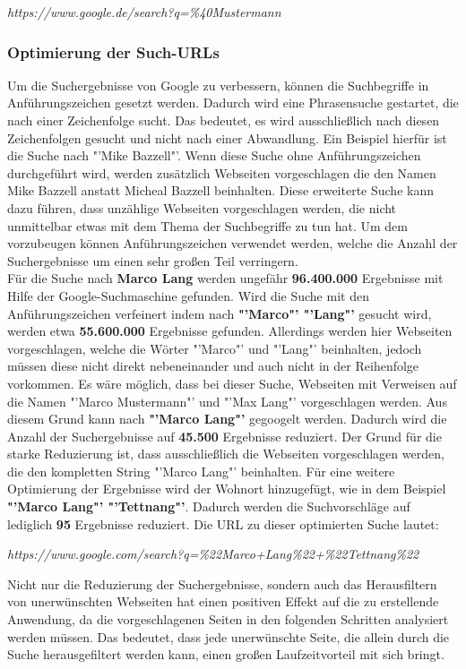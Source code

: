 			\textit{https://www.google.de/search?q=\%40Mustermann}
			
			\subsubsection{Optimierung der Such-URLs}
			\label{subsubsec:URLOptimieren}
			Um die Suchergebnisse von Google zu verbessern, können die Suchbegriffe in Anführungszeichen gesetzt werden. Dadurch wird eine Phrasensuche gestartet, die nach einer Zeichenfolge sucht. Das bedeutet, es wird ausschließlich nach diesen Zeichenfolgen gesucht und nicht nach einer Abwandlung. Ein Beispiel hierfür ist die Suche nach "'Mike Bazzell"'. Wenn diese Suche ohne Anführungszeichen durchgeführt wird, werden zusätzlich Webseiten vorgeschlagen die den Namen Mike Bazzell anstatt Micheal Bazzell beinhalten. Diese erweiterte Suche kann dazu führen, dass unzählige Webseiten vorgeschlagen werden, die nicht unmittelbar etwas mit dem Thema der Suchbegriffe zu tun hat. Um dem vorzubeugen können Anführungszeichen verwendet werden, welche die Anzahl der Suchergebnisse um einen sehr großen Teil verringern. \cite{Bazzell}\\
			Für die Suche nach \textbf{Marco Lang} werden ungefähr \textbf{96.400.000} Ergebnisse mit Hilfe der Google-Suchmaschine gefunden. Wird die Suche mit den Anführungszeichen verfeinert indem nach \textbf{"'Marco"' "'Lang"'} gesucht wird, werden etwa \textbf{55.600.000} Ergebnisse gefunden. Allerdings werden hier Webseiten vorgeschlagen, welche die Wörter "'Marco"' und "'Lang"' beinhalten, jedoch müssen diese nicht direkt nebeneinander und auch nicht in der Reihenfolge vorkommen. Es wäre möglich, dass bei dieser Suche, Webseiten mit Verweisen auf die Namen "'Marco Mustermann"' und "'Max Lang"' vorgeschlagen werden. Aus diesem Grund kann nach \textbf{"'Marco Lang"'} gegoogelt werden. Dadurch wird die Anzahl der Suchergebnisse auf \textbf{45.500} Ergebnisse reduziert. Der Grund für die starke Reduzierung ist, dass ausschließlich die Webseiten vorgeschlagen werden, die den kompletten String "'Marco Lang"' beinhalten. Für eine weitere Optimierung der Ergebnisse wird der Wohnort hinzugefügt, wie in dem Beispiel \textbf{"'Marco Lang"' "'Tettnang"'}. Dadurch werden die Suchvorschläge auf lediglich \textbf{95} Ergebnisse reduziert. Die URL zu dieser optimierten Suche lautet: 
			
			\textit{https://www.google.com/search?q=\%22Marco+Lang\%22+\%22Tettnang\%22}
			
			Nicht nur die Reduzierung der Suchergebnisse, sondern auch das Herausfiltern von unerwünschten Webseiten hat einen positiven Effekt auf die zu erstellende Anwendung, da die vorgeschlagenen Seiten in den folgenden Schritten analysiert werden müssen. Das bedeutet, dass jede unerwünschte Seite, die allein durch die Suche herausgefiltert werden kann, einen großen Laufzeitvorteil mit sich bringt. 
			
